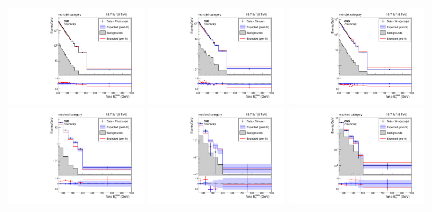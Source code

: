\begin{figure}[hbtp]\begin{center}
 \includegraphics[width=0.32\textwidth]{figures/post_fit_photon_monojet.pdf}
 \includegraphics[width=0.32\textwidth]{figures/post_fit_zmm_monojet.pdf}
 \includegraphics[width=0.32\textwidth]{figures/post_fit_wmn_monojet.pdf}\\
 \includegraphics[width=0.32\textwidth]{figures/post_fit_photon_resolved.pdf}
 \includegraphics[width=0.32\textwidth]{figures/post_fit_zmm_resolved.pdf}
 \includegraphics[width=0.32\textwidth]{figures/post_fit_wmn_resolved.pdf}\\

\end{center}
\end{figure}
